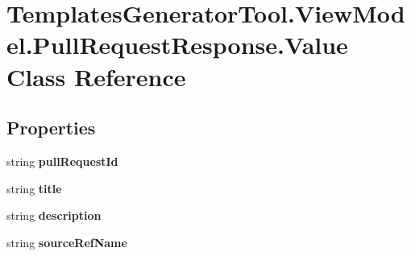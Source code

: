 \hypertarget{class_templates_generator_tool_1_1_view_model_1_1_pull_request_response_1_1_value}{}\section{Templates\+Generator\+Tool.\+View\+Model.\+Pull\+Request\+Response.\+Value Class Reference}
\label{class_templates_generator_tool_1_1_view_model_1_1_pull_request_response_1_1_value}
\subsection*{Properties}
\begin{DoxyCompactItemize}
\item 
\mbox{\label{class_templates_generator_tool_1_1_view_model_1_1_pull_request_response_1_1_value_a830b37dbdfd3586b80ef9e5ddc10f565}} 
string {\bfseries pull\+Request\+Id}
\item 
\mbox{\label{class_templates_generator_tool_1_1_view_model_1_1_pull_request_response_1_1_value_a9dde8449dd7c0c265e2e4f5ca60e99bb}} 
string {\bfseries title}
\item 
\mbox{\label{class_templates_generator_tool_1_1_view_model_1_1_pull_request_response_1_1_value_a9377567028c55c5b474320346a601cd8}} 
string {\bfseries description}
\item 
\mbox{\label{class_templates_generator_tool_1_1_view_model_1_1_pull_request_response_1_1_value_a0f26195540cd47f15bc585ca06eb5996}} 
string {\bfseries source\+Ref\+Name}
\item 

\end{DoxyCompactItemize}

